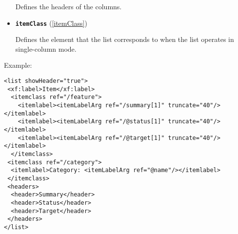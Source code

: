 \begin{description}
\begin{itemize}
Defines the headers of the columns.

 \item \textbf{\texttt{itemClass}} (\ref{itemClass})

Defines the element that the list corresponds to when the list operates in single-column mode.
\end{itemize}

 \item Example: 

\begin{lstlisting}[caption=\texttt{list} Element]
<list showHeader="true">
 <xf:label>Item</xf:label>
  <itemclass ref="/feature">
    <itemlabel><itemLabelArg ref="/summary[1]" truncate="40"/></itemlabel>
    <itemlabel><itemLabelArg ref="/@status[1]" truncate="40"/></itemlabel>
    <itemlabel><itemLabelArg ref="/@target[1]" truncate="40"/></itemlabel>
  </itemclass>
 <itemclass ref="/category">
  <itemlabel>Category: <itemLabelArg ref="@name"/></itemlabel>
 </itemclass>
 <headers>
  <header>Summary</header>
  <header>Status</header>
  <header>Target</header>
 </headers>
</list>
\end{lstlisting}
\end{description}









